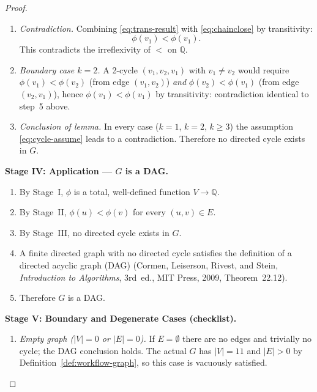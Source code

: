 \documentclass[12pt]{article}
\theoremstyle{definition}
\begin{document}
\begin{proof}
\begin{enumerate}
  \item \emph{Contradiction.}  Combining \eqref{eq:trans-result} with
        \eqref{eq:chainclose} by transitivity:
        \begin{equation}
          \phi(v_1) < \phi(v_1). \label{eq:contradiction}
        \end{equation}
        This contradicts the irreflexivity of $<$ on $\mathbb{Q}$.

  \item \emph{Boundary case $k=2$.}  A 2-cycle $(v_1,v_2,v_1)$ with
        $v_1 \neq v_2$ would require $\phi(v_1) < \phi(v_2)$ (from
        edge $(v_1,v_2)$) \emph{and} $\phi(v_2) < \phi(v_1)$ (from edge
        $(v_2,v_1)$), hence $\phi(v_1) < \phi(v_1)$ by transitivity:
        contradiction identical to step~5 above.

  \item \emph{Conclusion of lemma.}  In every case ($k=1$, $k=2$, $k\geq
        3$) the assumption \eqref{eq:cycle-assume} leads to a
        contradiction.  Therefore no directed cycle exists in $G$.
\end{enumerate}

\medskip
\noindent\textbf{Stage IV: Application --- $G$ is a DAG.}

\begin{enumerate}
  \item By Stage~I, $\phi$ is a total, well-defined function $V \to
        \mathbb{Q}$.
  \item By Stage~II, $\phi(u) < \phi(v)$ for every $(u,v)\in E$.
  \item By Stage~III, no directed cycle exists in $G$.
  \item A finite directed graph with no directed cycle satisfies the
        definition of a directed acyclic graph (DAG) (Cormen, Leiserson,
        Rivest, and Stein, \emph{Introduction to Algorithms},
        3rd~ed., MIT Press, 2009, Theorem~22.12).
  \item Therefore $G$ is a DAG. \qedhere
\end{enumerate}

\medskip
\noindent\textbf{Stage V: Boundary and Degenerate Cases (checklist).}

\begin{enumerate}
  \item \emph{Empty graph ($|V|=0$ or $|E|=0$).}  If $E = \emptyset$
        there are no edges and trivially no cycle; the DAG conclusion
        holds.  The actual $G$ has $|V|=11$ and $|E|>0$ by
        Definition~\ref{def:workflow-graph}, so this case is vacuously
        satisfied.


\end{enumerate}
\end{proof}
\end{document}
